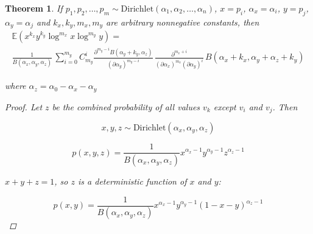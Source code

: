\documentclass{article}
\begin{document}
\newtheorem{theorem}{Theorem}
\begin{theorem}
If $p_1, p_2, \ldots, p_m \sim \textrm{Dirichlet}(\alpha_1, \alpha_2, \ldots, \alpha_n)$, $x = p_i$, $\alpha_x = \alpha_i$, $y = p_j$, $\alpha_y = \alpha_j$ and $k_x, k_y, m_x, m_y$ are arbitrary nonnegative constants, then 
\begin{multline}
\mathbb{E}(x^{k_x} y^{k_y} \log^{m_x} x \log^{m_y} y) = \\ \frac{1}{B(\alpha_x, \alpha_y, \alpha_z)} \,  \sum_{i=0}^{m_y}{ C^i_{m_y} \frac{\partial^{m_y-i} B(\alpha_y + k_y, \alpha_z)}{(\partial \alpha_y)^{m_y-i}} \, \frac{\partial^{m_x + i}}{(\partial \alpha_x)^{m_x} (\partial \alpha_y)^{i}} \, B(\alpha_x + k_x, \alpha_y + \alpha_z + k_y)}
\end{multline}

where $\alpha_z = \alpha_0 - \alpha_x - \alpha_y$
\begin{proof}
	Let $z$ be the combined probability of all values $v_k$ except $v_i$ and $v_j$. Then
	
	\begin{equation*}
	x, y, z \sim \textrm{Dirichlet}(\alpha_x, \alpha_y, \alpha_z)
	\end{equation*}
	
	\begin{equation}
	p(x, y, z) = \frac{1}{B(\alpha_x, \alpha_y, \alpha_z)} x^{\alpha_x - 1} y^{\alpha_y - 1} z^{\alpha_z - 1}
	\end{equation}
	
	
	$x + y + z = 1$, so $z$ is a deterministic function of $x$ and $y$: 
	
	\begin{equation}
	p(x, y) = \frac{1}{B(\alpha_x, \alpha_y, \alpha_z)} x^{\alpha_x - 1} y^{\alpha_y - 1} (1 - x - y)^{\alpha_z - 1}
	\end{equation}
	

\end{proof}
\end{theorem}
\end{document}
